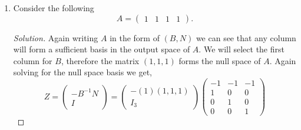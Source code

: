 \documentclass[12pt]{article}
\makeatletter
\theoremstyle{homework}
\newenvironment{exercise}[1]
{\def\@currentlabel{#1}\exercisecore}
{\endexercisecore}
\makeatother
\begin{document}
\begin{exercise}{3.1}
\begin{enumerate}
  \item[(ii)] Consider the following
  \begin{equation*}
    A = \begin{pmatrix}
      1 & 1 & 1 & 1
    \end{pmatrix}.
  \end{equation*}

  \begin{proof}[Solution] Again writing $A$ in the form of $(B, N)$ we can see that any column will 
    form a sufficient basis in the output space of $A$. We will select the first column for $B$,  therefore the matrix $(1, 1, 1)$ forms the null 
    space of $A$. Again solving for the null space basis we get, 
    \begin{equation*}
      Z =  
      \begin{pmatrix}
        -B^{-1}N\\
         I
      \end{pmatrix} = 
      \begin{pmatrix}
      -(1)(1, 1, 1)\\
      I_3
    \end{pmatrix}
    \begin{pmatrix}
      -1 & -1 & -1\\
      1& 0& 0 \\
      0& 1& 0 \\
      0& 0& 1
    \end{pmatrix}
    \end{equation*}
  \end{proof}
    \vspace{.15in}



\end{enumerate}
\end{exercise}
\end{document}
